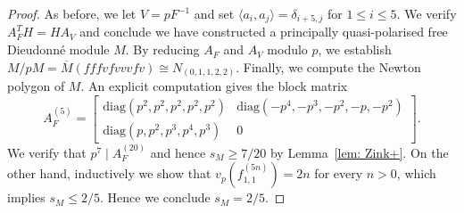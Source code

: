 \documentclass[10pt,a4paper]{amsart}
\newtheorem{comment}{Comment}
\begin{document}
\begin{proof}
As before, we let $V=pF^{-1}$ and set $\langle a_i,a_j\rangle=\delta_{i+5,j}$ for $1\leq i \leq 5$. We verify $A_F^TH=HA_V$ and conclude we have constructed a principally quasi-polarised free Dieudonn\'{e} module $M$. By reducing $A_F$ and $A_V$ modulo $p$, we establish $M/pM=\overline{M}(fffvfvvvfv) \cong N_{(0,1,1,2,2)}.$ Finally, we compute the Newton polygon of $M$. An explicit computation gives the block matrix
\[
A_F^{(5)} = \begin{bmatrix}
    \mathrm{diag}(p^2, p^2, p^2, p^2, p^2) & \mathrm{diag}(-p^4, -p^3, -p^2, -p, -p^2) \\
    \mathrm{diag}(p, p^2, p^3, p^4, p^3) & 0
\end{bmatrix}.
\]
We verify that $p^7 \mid A_F^{(20)}$ and hence $s_M\geq 7/20$ by Lemma~\ref{lem: Zink+}. On the other hand, inductively we show that  $v_p(f_{1,1}^{(5n)})=2n$ for every $n>0$, which implies $s_M \leq 2/5$. Hence we conclude $s_M=2/5$.

\end{proof}
\end{document}
